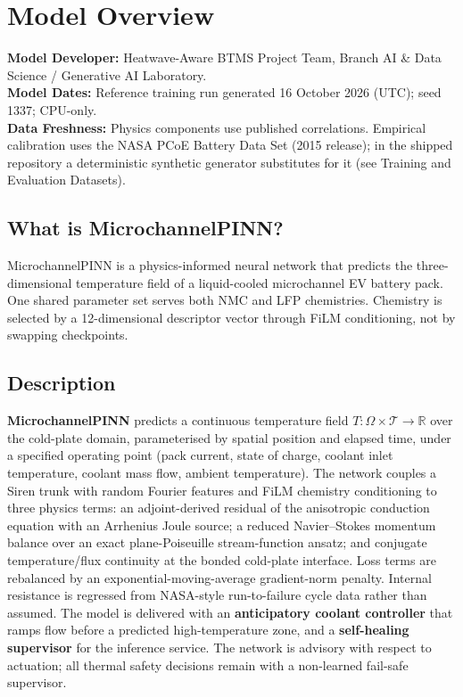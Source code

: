 \documentclass[10.5pt,a4paper]{article}
\begin{document}
\section*{Model Overview}
\textbf{Model Developer:} Heatwave-Aware BTMS Project Team, Branch AI \& Data Science / Generative AI Laboratory.\\
\textbf{Model Dates:} Reference training run generated 16 October 2026 (UTC); seed 1337; CPU-only.\\
\textbf{Data Freshness:} Physics components use published correlations. Empirical calibration uses the NASA PCoE Battery Data Set (2015 release); in the shipped repository a deterministic synthetic generator substitutes for it (see Training and Evaluation Datasets).

\subsection*{What is MicrochannelPINN?}
MicrochannelPINN is a physics-informed neural network that predicts the three-dimensional temperature field of a liquid-cooled microchannel EV battery pack. One shared parameter set serves both NMC and LFP chemistries. Chemistry is selected by a 12-dimensional descriptor vector through FiLM conditioning, not by swapping checkpoints.

\subsection*{Description}
\textbf{MicrochannelPINN} predicts a continuous temperature field $T:\Omega\times\mathcal{T}\to\mathbb{R}$ over the cold-plate domain, parameterised by spatial position and elapsed time, under a specified operating point (pack current, state of charge, coolant inlet temperature, coolant mass flow, ambient temperature).
The network couples a Siren trunk with random Fourier features and FiLM chemistry conditioning to three physics terms: an adjoint-derived residual of the anisotropic conduction equation with an Arrhenius Joule source; a reduced Navier--Stokes momentum balance over an exact plane-Poiseuille stream-function ansatz; and conjugate temperature/flux continuity at the bonded cold-plate interface. Loss terms are rebalanced by an exponential-moving-average gradient-norm penalty. Internal resistance is regressed from NASA-style run-to-failure cycle data rather than assumed.
The model is delivered with an \textbf{anticipatory coolant controller} that ramps flow before a predicted high-temperature zone, and a \textbf{self-healing supervisor} for the inference service. The network is advisory with respect to actuation; all thermal safety decisions remain with a non-learned fail-safe supervisor.
\end{document}
